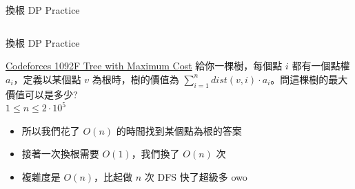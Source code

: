 \documentclass[aspectratio=169]{beamer}
\begin{document}
\begin{frame}{換根 DP Practice}
\begin{columns}
\begin{column}{0.4\textwidth}
\begin{center}
                \end{center}
            \end{column}
        \end{columns}
    \end{frame}
    
    \begin{frame}{換根 DP Practice}
        \begin{block}{\href{https://codeforces.com/contest/1092/problem/F}{Codeforces 1092F Tree with Maximum Cost}}
        給你一棵樹，每個點 $i$ 都有一個點權 $a_i$，定義以某個點 $v$ 為根時，樹的價值為 $\sum_{i=1}^n dist(v,i) \cdot a_i$。問這棵樹的最大價值可以是多少? \\
        \vspace{5mm}
        $1 \le n \le 2 \cdot 10^5$
        \end{block}
        \begin{itemize}
            \item 所以我們花了 $O(n)$ 的時間找到某個點為根的答案
            \item 接著一次換根需要 $O(1)$，我們換了 $O(n)$ 次
            \item 複雜度是 $O(n)$，比起做 $n$ 次 DFS 快了超級多 owo
        \end{itemize}
    \end{frame}
    
\end{document}
